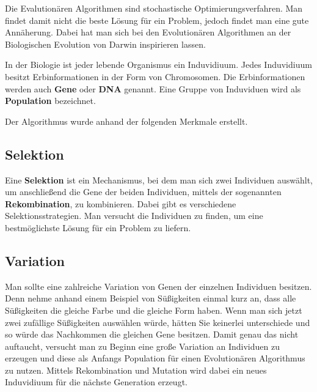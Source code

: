 
Die Evalutionären Algorithmen sind stochastische Optimierungsverfahren. Man findet damit nicht die beste Lösung für ein Problem, jedoch findet man eine gute Annäherung.
Dabei hat man sich bei den Evolutionären Algorithmen an der Biologischen Evolution von Darwin inspirieren lassen. \cite{selzam2003genetische}

In der Biologie ist jeder lebende Organismus ein Induvidiuum.
Jedes Induvidiuum besitzt Erbinformationen in der Form von Chromosomen. Die Erbinformationen werden auch \textbf{Gene} oder \textbf{DNA} genannt.
Eine Gruppe von Induviduen wird als \textbf{Population} bezeichnet.

Der Algorithmus wurde anhand der folgenden Merkmale erstellt.

\subsection{Selektion}
\label{ch:Grundlagen:sec:Taktile Geräte:subsec:Selektion}

Eine \textbf{Selektion} ist ein Mechanismus, bei dem man sich zwei Individuen auswählt, um anschließend die Gene der beiden Individuen, mittels der sogenannten \textbf{Rekombination}, zu kombinieren. Dabei gibt es verschiedene Selektionsstrategien. Man versucht die Individuen zu finden, um eine bestmöglichste Lösung für ein Problem zu liefern.

\subsection{Variation}
\label{ch:Grundlagen:sec:Taktile Geräte:subsec:Variation}

Man sollte eine zahlreiche Variation von Genen der einzelnen Individuen besitzen. 
Denn nehme anhand einem Beispiel von Süßigkeiten einmal kurz an, dass alle Süßigkeiten die gleiche Farbe und die gleiche Form haben. Wenn man sich jetzt zwei zufällige Süßigkeiten auswählen würde, hätten Sie keinerlei unterschiede und so würde das Nachkommen die gleichen Gene besitzen. Damit genau das nicht auftaucht, versucht man zu Beginn eine große Variation an Individuen zu erzeugen und diese als Anfangs Population für einen Evolutionären Algorithmus zu nutzen. Mittels Rekombination und Mutation wird dabei ein neues Induvidiuum für die nächste Generation erzeugt. 


